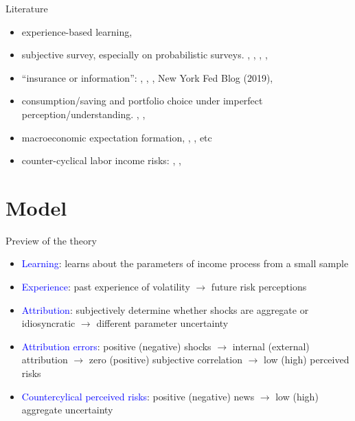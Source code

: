 \documentclass{beamer}
\begin{document}
\begin{frame}{Literature}
\begin{itemize}
	 \item experience-based learning, \cite{malmendier2015learning} 
	 \item subjective survey, especially on probabilistic surveys.  \cite{manski_measuring_2004}, \cite{delavande2011measuring}, \cite{manski_survey_2018},  \cite{bertrand_people_2001}, \cite{armantier_overview_2017}
	\item ``insurance or information'':  \cite{kaufmann_disentangling_2009},  \cite{meghir2011earnings}, \cite{pistaferri_superior_2001}, New York Fed Blog (2019),  \cite{flavin_excess_1988}
   \item consumption/saving and portfolio choice under imperfect perception/understanding. \cite{rozsypal_overpersistence_2017}, \cite{carroll_sticky_2018}, \cite{lian2019imperfect}
   \item macroeconomic expectation formation, \cite{coibion2012can}, \cite{fuhrer2018intrinsic}, etc
   \item counter-cyclical labor income risks: \cite{storesletten2004cyclical}, \cite{guvenen2014nature}, \cite{catherine_countercyclical_2019}
  \end{itemize}
\end{frame}


\section{Model}


\begin{frame}{Preview of the theory}
	\begin{itemize}
		\item \textcolor{blue}{Learning}: learns about the parameters of income process from a small sample 
		\item \textcolor{blue}{Experience}: past experience of volatility $\rightarrow$  future risk perceptions 
		\item \textcolor{blue}{Attribution}: subjectively determine whether shocks are aggregate or idiosyncratic $\rightarrow$ different parameter uncertainty
		\item \textcolor{blue}{Attribution errors}: positive (negative) shocks $\rightarrow$ internal (external) attribution $\rightarrow$  zero (positive) subjective correlation $\rightarrow$ low (high) perceived risks 
		\item \textcolor{blue}{Countercylical perceived risks}: positive (negative) news $\rightarrow$ low (high) aggregate uncertainty  
		\end{itemize}
\end{frame}
\end{document}
